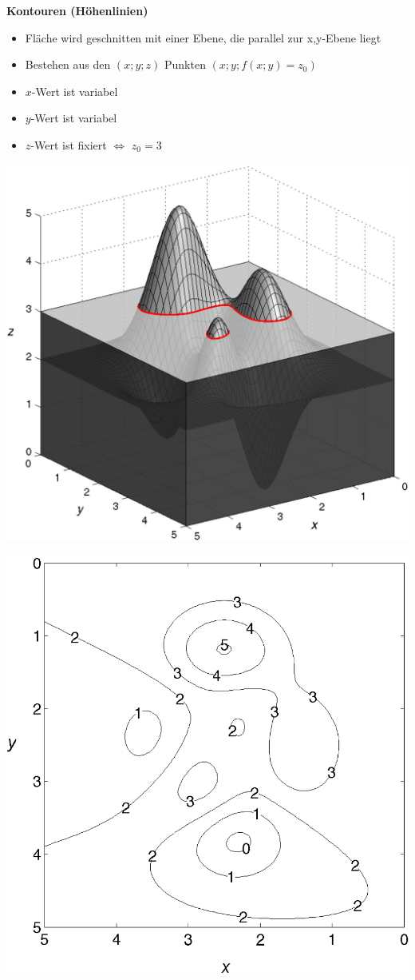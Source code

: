
    \textbf{Kontouren (Höhenlinien)}
    \begin{itemize}
        \item Fläche wird geschnitten mit einer Ebene, die parallel zur x,y-Ebene liegt
        \item Bestehen aus den $(x;y;z)$ Punkten $(x ; y; f(x;y) = z_0)$
        \item $x$-Wert ist variabel
        \item $y$-Wert ist variabel
        \item ${z}$-Wert ist fixiert $\Leftrightarrow$ $z_0 = 3$
    \end{itemize} 

\begin{minipage}[t]{0.48\columnwidth}
    \includegraphics[width=\columnwidth]{images/niveaulinien1.png}
\end{minipage}
\hfill
\begin{minipage}[t]{0.48\columnwidth}
    \includegraphics[width=\columnwidth]{images/niveaulinien2.png}
\end{minipage}


